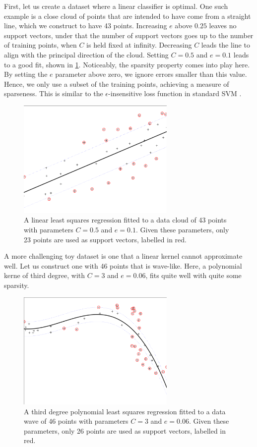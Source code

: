 \documentclass[10pt,a4paper]{article}
\begin{document}
First, let us create a dataset where a linear classifier is optimal. One such example is a close cloud of points that are intended to have come from a straight line, which we construct to have 43 points. Increasing $e$ above $0.25$ leaves no support vectors, under that the number of support vectors goes up to the number of training points, when $C$ is held fixed at infinity. Decreasing $C$ leads the line to align with the principal direction of the cloud. Setting $C=0.5$ and $e=0.1$ leads to a good fit, shown in \ref{fig:uiregress}. Noticeably, the sparsity property comes into play here. By setting the $e$ parameter above zero, we ignore errors smaller than this value. Hence, we only use a subset of the training points, achieving a measure of sparseness. This is similar to the $\epsilon$-insensitive loss function in standard SVM \cite{valyonRobustLSSVMRegression2007}.

\begin{figure}[h!]
\centering
  \includegraphics[width=3in]{uiregressFinal.png}
  \caption{A linear least squares regression fitted to a data cloud of 43 points with parameters $C=0.5$ and $e=0.1$. Given these parameters, only 23 points are used as support vectors, labelled in red.}
  \label{fig:uiregress}
\end{figure}

A more challenging toy dataset is one that a linear kernel cannot approximate well. Let us construct one with 46 points that is wave-like. Here, a polynomial kerne of third degree, with $C=3$ and $e=0.06$, fits quite well with quite some sparsity.

\begin{figure}[h!]
\centering
  \includegraphics[width=3in]{uiregressPoly.png}
  \caption{A third degree polynomial least squares regression fitted to a data wave of 46 points with parameters $C=3$ and $e=0.06$. Given these parameters, only 26 points are used as support vectors, labelled in red.}
  \label{fig:uiregressPoly}
\end{figure}
\end{document}
